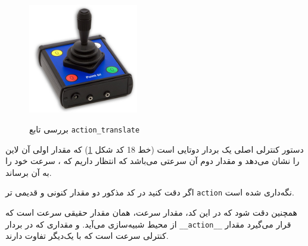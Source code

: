 \begin{figure}
\begin{minipage}{4.8cm}
\centering
\includegraphics[width=4.8cm]{Figures/joystick}
\label{fig:joystick}
\\[2em]
\end{minipage}
\hspace*{0.5cm}
\begin{minipage}{10cm}
\end{minipage}
\caption{بررسی تابع \texttt{action\_translate}}
\label{fig:minipage-joystick}
\end{figure}

\begin{note}
	دستور کنترلی اصلی یک بردار دوتایی است (خط  18 کد شکل \ref{fig:minipage-joystick}) که مقدار اولی آن لاین را نشان می‌دهد و مقدار دوم آن سرعتی می‌باشد که انتظار داریم که ، سرعت خود را به آن برساند. 
\end{note}
\begin{note}
	اگر دقت کنید در کد مذکور دو مقدار کنونی و قدیمی تر \texttt{action} نگه‌داری شده است.
\end{note}
\begin{note}
	همچنین دقت شود که در این کد، مقدار سرعت، همان مقدار حقیقی سرعت است که از محیط شبیه‌سازی می‌آید. و مقداری که در بردار \texttt{\_\_action\_\_} قرار می‌گیرد مقدار کنترلی سرعت است که با یک‌دیگر تفاوت دارند.
\end{note}


